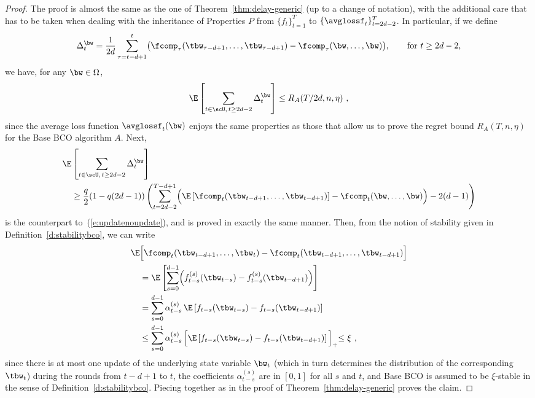 \begin{proof}
The proof is almost the same as the one of Theorem~\ref{thm:delay-generic} (up to a change of notation), with the additional care that has to be taken when dealing with the inheritance of Properties $P$ from $\{f_t\}_{t=1}^T$ to $\{\avglossf_t\}_{t=2d-2}^T$. 
%
In particular, if we define
\[
\Delta_t^{\bw} = \frac{1}{2d}\sum_{\tau=t-d+1}^t \bigl(\fcomp_\tau(\tbw_{\tau-d+1},\dots,\tbw_{\tau-d+1}) - \fcomp_\tau(\bw,\dots,\bw)\bigl),\qquad {\mbox{for $t \geq 2d-2$,}}
\]
we have, for any $\bw \in \Omega$,
\[
\E\left[\sum_{t \in \scU,\, t\geq 2d-2} \Delta_t^{\bw}  \right] \leq R_A(T/2d, n ,\eta)~,
\]
since the average loss function $\avglossf_t(\bw)$ enjoys the same properties as those that allow us to prove the regret bound $R_A(T, n ,\eta)$ for the Base BCO algorithm $A$.
%
Next,
%
\begin{align*}
\E&\left[\sum_{t \in \scU,\,t\geq 2d-2} \Delta_t^{\bw} \right] \\
  &\geq
    \frac{q}{2}(1-q(2d-1))\left(\sum_{t=2d-2}^{T-d+1} \Bigl(\E\left[\fcomp_t(\tbw_{t-d+1},\dots,\tbw_{t-d+1})\right] - \fcomp_t(\bw,\dots,\bw)\Bigr) -2(d-1)\right)
\end{align*}
%
is the counterpart to~(\ref{e:updatenoupdate}), and is proved in exactly the same manner. Then, from the notion of stability given in Definition~\ref{d:stabilitybco}, we can write
%
\begin{align*}
    \E&\Bigl[ \fcomp_t(\tbw_{t-d+1},\dots,\tbw_t) - \fcomp_t(\tbw_{t-d+1},\dots,\tbw_{t-d+1}) \Bigr]
\\&=
    \E\left[ \sum_{s=0}^{d-1} \Bigl( f_{t-s}^{(s)}(\tbw_{t-s}) - f_{t-s}^{(s)}(\tbw_{t-d+1})   \Bigr)\right]\\
&=
    \sum_{s=0}^{d-1}\alpha_{t-s}^{(s)}\,\E\left[ f_{t-s}(\tbw_{t-s}) - f_{t-s}(\tbw_{t-d+1})\right]\\
&\leq
    \sum_{s=0}^{d-1}\alpha_{t-s}^{(s)}\,\Bigl[\E\left[ f_{t-s}(\tbw_{t-s}) - f_{t-s}(\tbw_{t-d+1})\right]\Bigl]_+
\leq
	\xi~,
\end{align*}
since there is at most one update of the underlying state variable $\bw_t$ (which in turn determines the distribution of the corresponding $\tbw_t$)
during the rounds from $t-d+1$ to $t$, the coefficients $\alpha_{t-s}^{(s)}$ are in $[0,1]$ for all $s$ and $t$, and Base BCO is assumed to be $\xi$-stable in 
the sense of Definition~\ref{d:stabilitybco}.
%
Piecing together as in the proof of Theorem~\ref{thm:delay-generic} proves the claim.
\end{proof}





